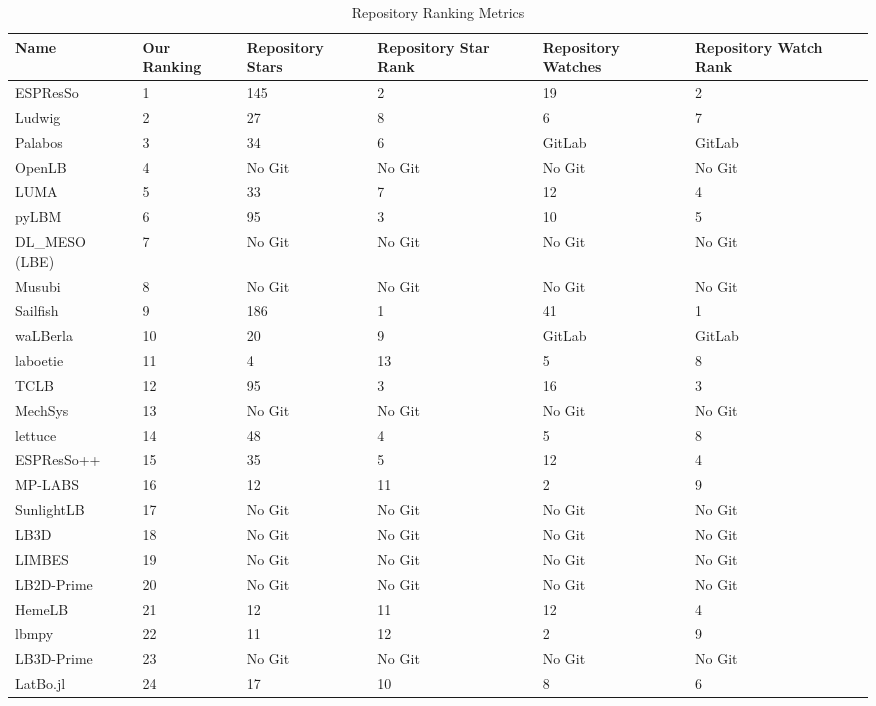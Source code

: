 \documentclass[final, 3p, times, authoryear]{elsarticle}
\begin{document}
\begin{table}
	\begin{center}
		\begin{tabular}{ p{3cm}p{1.25cm}p{1.75cm}p{1.75cm}p{1.75cm}p{1.75cm} }
			\toprule
			Name & Our Ranking & Repository Stars & Repository Star Rank &
			Repository Watches & Repository Watch Rank\\
			\midrule
			ESPResSo & 1 & 145 & 2 & 19& 2\\
			Ludwig & 2 & 27 & 8 & 6& 7\\
			Palabos & 3 & 34 & 6 & GitLab& GitLab\\
			OpenLB & 4 & No Git & No Git & No Git& No Git\\
			LUMA & 5 & 33 & 7 & 12& 4\\
			pyLBM & 6 & 95 & 3 & 10& 5\\
			DL\_MESO (LBE) & 7 & No Git & No Git & No Git & No Git\\
			Musubi & 8 & No Git & No Git & No Git & No Git\\
			Sailfish & 9 & 186 & 1 & 41& 1\\
			waLBerla & 10 & 20 & 9 & GitLab& GitLab\\
			laboetie & 11 & 4 & 13 & 5& 8\\
			TCLB & 12 & 95 & 3 & 16& 3\\
			MechSys & 13 & No Git & No Git & No Git& No Git\\
			lettuce & 14 & 48 & 4 & 5& 8\\
			ESPResSo++ & 15 & 35 & 5 & 12& 4\\
			MP-LABS & 16 & 12 & 11 & 2& 9\\			
			SunlightLB & 17 & No Git & No Git & No Git& No Git\\
			LB3D & 18 & No Git & No Git & No Git& No Git\\			
			LIMBES & 19 & No Git & No Git & No Git& No Git\\
			LB2D-Prime & 20 & No Git & No Git & No Git& No Git\\		
			HemeLB & 21 & 12 & 11 & 12& 4\\
			lbmpy & 22 &  11 & 12 & 2& 9\\	
			LB3D-Prime & 23 & No Git & No Git & No Git& No Git\\	
			LatBo.jl & 24 & 17 & 10 & 8& 6\\			
			\bottomrule
		\end{tabular}
		\caption{Repository Ranking Metrics} \label{repometrics}
	\end{center}
	\end{table}
\end{document}
